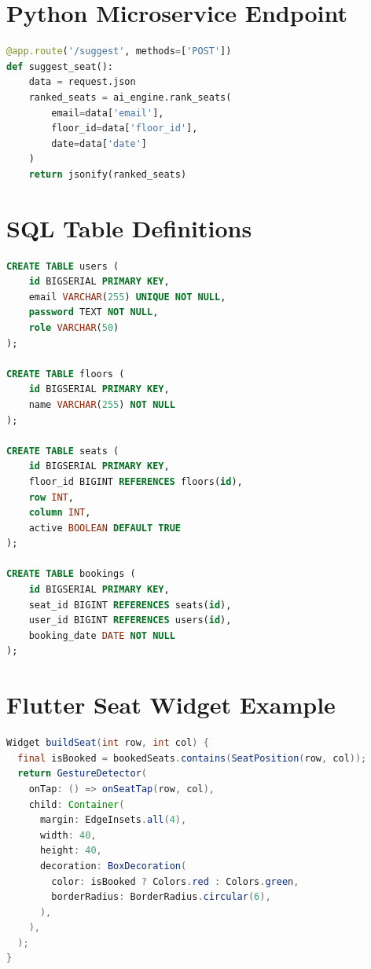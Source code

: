 \documentclass[12pt,a4paper]{report} %
\begin{document}
\chapter{Python Microservice Endpoint}
\label{appendix:microservice}

\begin{lstlisting}[language=Python, caption=Seat Suggestion Endpoint (Flask), label=lst:python-endpoint]
@app.route('/suggest', methods=['POST'])
def suggest_seat():
    data = request.json
    ranked_seats = ai_engine.rank_seats(
        email=data['email'],
        floor_id=data['floor_id'],
        date=data['date']
    )
    return jsonify(ranked_seats)
\end{lstlisting}

\chapter{SQL Table Definitions}
\label{appendix:sql}

\begin{lstlisting}[language=SQL, caption=Database Schema, label=lst:sql-schema]
CREATE TABLE users (
    id BIGSERIAL PRIMARY KEY,
    email VARCHAR(255) UNIQUE NOT NULL,
    password TEXT NOT NULL,
    role VARCHAR(50)
);

CREATE TABLE floors (
    id BIGSERIAL PRIMARY KEY,
    name VARCHAR(255) NOT NULL
);

CREATE TABLE seats (
    id BIGSERIAL PRIMARY KEY,
    floor_id BIGINT REFERENCES floors(id),
    row INT,
    column INT,
    active BOOLEAN DEFAULT TRUE
);

CREATE TABLE bookings (
    id BIGSERIAL PRIMARY KEY,
    seat_id BIGINT REFERENCES seats(id),
    user_id BIGINT REFERENCES users(id),
    booking_date DATE NOT NULL
);
\end{lstlisting}

\chapter{Flutter Seat Widget Example}
\label{appendix:flutter}

\begin{lstlisting}[language=Java, caption=Seat Booking Widget (Flutter), label=lst:flutter-ui]
Widget buildSeat(int row, int col) {
  final isBooked = bookedSeats.contains(SeatPosition(row, col));
  return GestureDetector(
    onTap: () => onSeatTap(row, col),
    child: Container(
      margin: EdgeInsets.all(4),
      width: 40,
      height: 40,
      decoration: BoxDecoration(
        color: isBooked ? Colors.red : Colors.green,
        borderRadius: BorderRadius.circular(6),
      ),
    ),
  );
}
\end{lstlisting}
\end{document}
